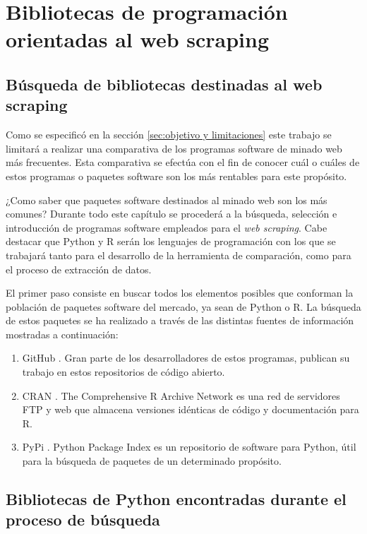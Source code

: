 \chapter{Bibliotecas de programación orientadas al web scraping}
\label{cha:bibliotecas de programacion orientadas al web scraping}

\section{Búsqueda de bibliotecas destinadas al web scraping}
\label{sec:busqueda de bibliotecas destinadas al web scraping}

Como se especificó en la sección \ref{sec:objetivo y limitaciones} este trabajo se limitará a realizar
una comparativa de los programas software de minado web más frecuentes. Esta comparativa se efectúa con el
fin de conocer cuál o cuáles de estos programas o paquetes software son los más rentables para este propósito.

¿Como saber que paquetes software destinados al minado web son los más comunes? Durante todo este capítulo
se procederá a la búsqueda, selección e introducción de programas software empleados para el \emph{web 
scraping}. Cabe destacar que Python y R serán los lenguajes de programación con los que se trabajará tanto 
para el desarrollo de la herramienta de comparación, como para el proceso de extracción de datos.

El primer paso consiste en buscar todos los elementos posibles que conforman la población de paquetes
software del mercado, ya sean de Python o R. La búsqueda de estos paquetes se ha realizado a través de las 
distintas fuentes de información mostradas a continuación:

\begin{enumerate}
  \item GitHub \cite{github}. Gran parte de los desarrolladores de estos programas, publican su trabajo en
  estos repositorios de código abierto.
  \item CRAN \cite{cran}. The Comprehensive R Archive Network es una red de servidores FTP y web que
  almacena versiones idénticas de código y documentación para R.
  \item PyPi \cite{pypi}. Python Package Index es un repositorio de software para Python, útil para la
  búsqueda de paquetes de un determinado propósito.
\end{enumerate}

\section{Bibliotecas de Python encontradas durante el proceso de búsqueda}
\label{sec:bibliotecas de python encontradas durante el proceso de busqueda}

